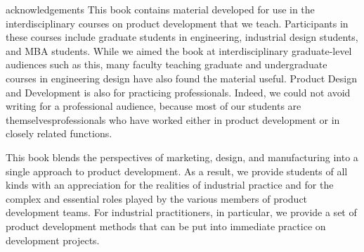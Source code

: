 %
%
%
%
%
%

\begin{acknowledgements}
acknowledgements  This book contains material developed for use
in the interdisciplinary courses on product development that we teach.
Participants in these courses include graduate students in engineering,
industrial design students, and MBA students. While we
aimed the book at interdisciplinary graduate-level audiences such
as this, many faculty teaching graduate and undergraduate courses
in engineering design have also found the material useful. Product
Design and Development is also for practicing professionals. Indeed,
we could not avoid writing  for  a  professional  audience,
because  most  of  our  students  are  themselvesprofessionals who have worked
either in product development or in closely related functions.

This book blends the perspectives of marketing, design, and manufacturing into
a single approach to product development. As a result, we provide students
of all kinds with an appreciation for the realities of industrial practice
and for the complex and essential roles played by the various members of
product development teams. For industrial practitioners, in  particular,
we  provide  a  set  of  product  development  methods  that  can  be
put  into immediate practice on development projects.
\end{acknowledgements}

